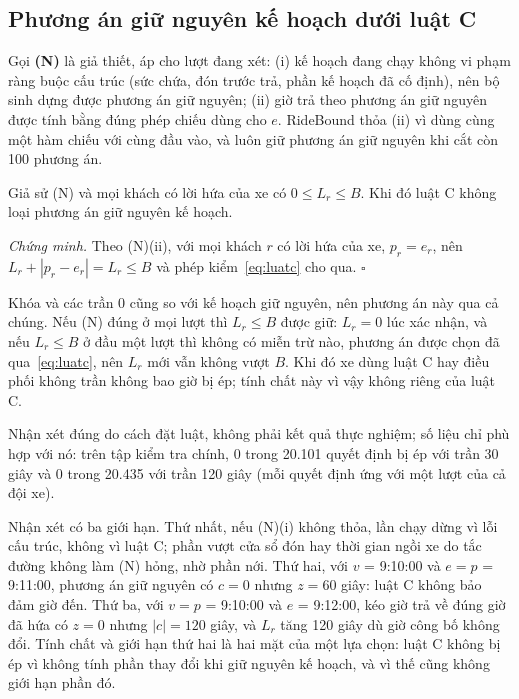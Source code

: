\subsection{Phương án giữ nguyên kế hoạch dưới luật C}
\label{muc:giunguyen}

Gọi \textbf{(N)} là giả thiết, áp cho lượt đang xét: (i) kế hoạch đang chạy không vi phạm ràng buộc cấu trúc
(sức chứa, đón trước trả, phần kế hoạch đã cố định), nên bộ sinh dựng được phương án giữ nguyên; (ii) giờ trả
theo phương án giữ nguyên được tính bằng đúng phép chiếu dùng cho $e$. RideBound thỏa (ii) vì dùng cùng một hàm
chiếu với cùng đầu vào, và luôn giữ phương án giữ nguyên khi cắt còn 100 phương án.

\begin{nhanxet}
\label{nx:giunguyen}
Giả sử (N) và mọi khách có lời hứa của xe có $0 \le L_r \le B$. Khi đó luật C không loại phương án giữ nguyên
kế hoạch.
\end{nhanxet}

\noindent\textit{Chứng minh.} Theo (N)(ii), với mọi khách $r$ có lời hứa của xe, $p_r = e_r$, nên
$L_r + |p_r - e_r| = L_r \le B$ và phép kiểm~\eqref{eq:luatc} cho qua. \hfill$\square$

Khóa và các trần 0 cũng so với kế hoạch giữ nguyên, nên phương án này qua cả chúng. Nếu (N) đúng ở mọi lượt thì
$L_r \le B$ được giữ: $L_r = 0$ lúc xác nhận, và nếu $L_r \le B$ ở đầu một lượt thì không có miễn trừ nào, phương
án được chọn đã qua~\eqref{eq:luatc}, nên $L_r$ mới vẫn không vượt $B$. Khi đó xe dùng luật C hay điều phối không
trần không bao giờ bị ép; tính chất này vì vậy không riêng của luật C.

Nhận xét đúng do cách đặt luật, không phải kết quả thực nghiệm; số liệu chỉ phù hợp với nó: trên tập kiểm tra
chính, 0 trong 20.101 quyết định bị ép với trần 30 giây và 0 trong 20.435 với trần 120 giây (mỗi quyết định ứng với
một lượt của cả đội xe).

Nhận xét có ba giới hạn. Thứ nhất, nếu (N)(i) không thỏa, lần chạy dừng vì lỗi cấu trúc, không vì luật C; phần
vượt cửa sổ đón hay thời gian ngồi xe do tắc đường không làm (N) hỏng, nhờ phần nới. Thứ hai, với $v$ = 9:10:00 và
$e = p$ = 9:11:00, phương án giữ nguyên có $c = 0$ nhưng $z = 60$ giây: luật C không bảo đảm giờ đến. Thứ ba, với
$v = p$ = 9:10:00 và $e$ = 9:12:00, kéo giờ trả về đúng giờ đã hứa có $z = 0$ nhưng $|c| = 120$ giây, và $L_r$
tăng 120 giây dù giờ công bố không đổi. Tính chất và giới hạn thứ hai là hai mặt của một lựa chọn: luật C không
bị ép vì không tính phần thay đổi khi giữ nguyên kế hoạch, và vì thế cũng không giới hạn phần đó.

